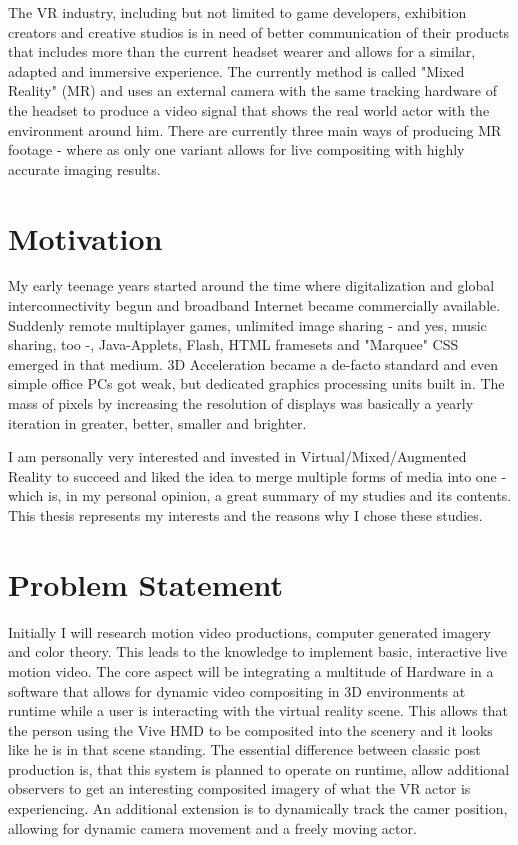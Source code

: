 The VR industry, including but not limited to game developers, exhibition 
creators and creative studios is in need of better communication of their 
products that includes more than the current headset wearer and allows for a 
similar, adapted and immersive experience.
\newline
The currently method is called "Mixed Reality" (MR) and uses an external camera 
with the same tracking hardware of the headset to produce a video signal that 
shows the real world actor with the environment around him. There are currently 
three main ways of producing MR footage - where as only one variant allows for 
live compositing with highly accurate imaging results.


\section{Motivation}
\label{sec:intro:motivation}

My early teenage years started around the time where digitalization and global
interconnectivity begun and broadband Internet became commercially available.
Suddenly remote multiplayer games, unlimited image sharing - and yes, music
sharing, too -, Java-Applets, Flash, HTML framesets and "Marquee" CSS emerged in
that medium. 3D Acceleration became a de-facto standard and even simple office
PCs got weak, but dedicated graphics processing units built in. The mass of
pixels by increasing the resolution of displays was basically a yearly
iteration in greater, better, smaller and brighter.

I am personally very interested and invested in Virtual/Mixed/Augmented Reality 
to succeed and liked the idea to merge multiple forms of media into one - which 
is, in my personal opinion, a great summary of my studies and its contents. 
This thesis represents my interests and the reasons why I chose these studies.

\section{Problem Statement}

Initially I will research motion video productions, computer generated imagery 
and color theory. This leads to the knowledge to implement basic, interactive 
live motion video.
\newline
The core aspect will be integrating a multitude of Hardware in a software that 
allows for dynamic video compositing in 3D environments at runtime while a user 
is interacting with the virtual reality scene. This allows that the person 
using the Vive HMD to be composited into the scenery and it looks like he is in 
that scene standing. The essential difference between classic post production 
is, that this system is planned to operate on runtime, allow additional 
observers to get an interesting composited imagery of what the VR actor is 
experiencing.
\newline
An additional extension is to dynamically track the camer position, allowing 
for dynamic camera movement and a freely moving actor. 


